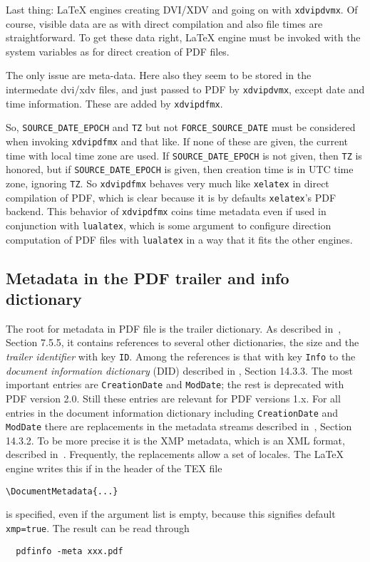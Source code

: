 \documentclass[a4paper, english]{article}%
\newcommand{\lualatex}{\texttt{lualatex}}
\newcommand{\xelatex}{\texttt{xelatex}}
\begin{document}
Last thing: 
\LaTeX{} engines creating DVI/XDV and going on with \texttt{xdvipdvmx}. 
Of course, visible data are as with direct compilation and also file times are straightforward. 
To get these data right, \LaTeX{} engine must be invoked with the system variables 
as for direct creation of PDF files. 

The only issue are meta-data. 
Here also they seem to be stored in the intermedate dvi/xdv files, 
and just passed to PDF by \texttt{xdvipdvmx}, 
except date and time information. 
These are added by \texttt{xdvipdfmx}. 

So, \texttt{SOURCE\_DATE\_EPOCH} and \texttt{TZ} but not \texttt{FORCE\_SOURCE\_DATE} 
must be considered when invoking \texttt{xdvipdfmx} and that like. 
If none of these are given, the current time with local time zone are used. 
If \texttt{SOURCE\_DATE\_EPOCH} is not given, then \texttt{TZ} is honored, 
but if \texttt{SOURCE\_DATE\_EPOCH} is given, then creation time is in UTC time zone, 
ignoring \texttt{TZ}. 
So \texttt{xdvipdfmx} behaves very much like \xelatex{} in direct compilation of PDF, 
which is clear because it is by defaults \xelatex's PDF backend. 
This behavior of \texttt{xdvipdfmx} coins time metadata even if used in conjunction with \lualatex, 
which is some argument to configure direction computation of PDF files with \lualatex 
in a way that it fits the other engines. 



\subsection{Metadata in the PDF trailer and info dictionary}\label{subsec:trailerInfoDict}

The root for metadata in PDF file is the trailer dictionary. 
As described in~\cite{Pdf20}, Section 7.5.5, 
it contains references to several other dictionaries, 
the size and the \emph{trailer identifier} with key \texttt{ID}. 
Among the references is that with key \texttt{Info} 
to the \emph{document information dictionary} (DID) described in \cite{Pdf20}, Section 14.3.3. 
The most important entries are \texttt{CreationDate} and \texttt{ModDate}; 
the rest is deprecated with PDF version 2.0. 
Still these entries are relevant for PDF versions 1.x. 
For all entries in the document information dictionary including \texttt{CreationDate} and \texttt{ModDate} 
there are replacements in the metadata streams described in~\cite{Pdf20}, Section 14.3.2. 
To be more precise it is the XMP metadata, which is an XML format, described in~\cite{ISO16684-1}. 
Frequently, the replacements allow a set of locales. 
The \LaTeX{} engine writes this if in the header of the TEX file 
%
\begin{verbatim}
\DocumentMetadata{...}
\end{verbatim}
%
is specified, even if the argument list is empty, because this signifies default \texttt{xmp=true}. 
The result can be read through 
%
\begin{verbatim}
  pdfinfo -meta xxx.pdf
\end{verbatim}
\end{document}
